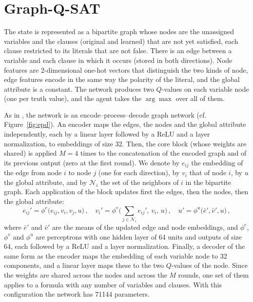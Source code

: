 \documentclass[11pt,a4paper]{article}
\begin{document}
\section{Graph-Q-SAT}\label{sec:gqsat}

The state is represented \cite{Kurin2020} as a bipartite graph whose nodes are
the unassigned variables and the clauses (original and learned) that are not
yet satisfied, each clause restricted to its literals that are not false. There
is an edge between a variable and each clause in which it occurs (stored in
both directions). Node features are 2-dimensional one-hot vectors that
distinguish the two kinds of node, edge features encode in the same way the
polarity of the literal, and the global attribute is a constant. The network
produces two $Q$-values on each variable node (one per truth value), and the
agent takes the $\arg\max$ over all of them.

\smallskip
\noindent
As in \cite{Kurin2020}, the network is an encode--process--decode graph network
\cite{Battaglia2018} (cf. Figure~\ref{fig:epd}). An encoder maps the edges, the
nodes and the global attribute independently, each by a linear layer followed
by a ReLU and a layer normalization, to embeddings of size 32. Then, the core
block (whose weights are shared) is applied $M = 4$ times to the concatenation
of the encoded graph and of its previous output (zero at the first round). We
denote by $e_{ij}$ the embedding of the edge from node $i$ to node $j$ (one for
each direction), by $v_i$ that of node $i$, by $u$ the
global attribute, and by $\mathcal N_i$ the set of the neighbors of $i$ in the
bipartite graph. Each application of the block updates first the edges, then
the nodes, then the global attribute:
\begin{equation}\label{eq:gnblock}
  e_{ij}' = \phi^e\big(e_{ij}, v_i, v_j, u\big) \, , \quad
  v_i' = \phi^v\Big(\textstyle\sum_{j \in \mathcal N_i} e_{ij}', \, v_i, \, u\Big) \, , \quad
  u'   = \phi^u\big(\bar e', \bar v', u\big) \, ,
\end{equation}
where $\bar e'$ and $\bar v'$ are the means of the updated edge and node
embeddings, and $\phi^e$, $\phi^v$ and $\phi^u$ are perceptrons with one hidden
layer of 64 units and outputs of size 64, each followed by a ReLU and a layer
normalization. Finally, a decoder of the same form as the encoder maps the
embedding of each variable node to 32 components, and a linear layer maps
these to the two $Q$-values of the node. Since the weights are shared across
the nodes and across the $M$ rounds, one set of them applies to a formula with
any number of variables and clauses. With this configuration the network has
71144 parameters.
\end{document}

